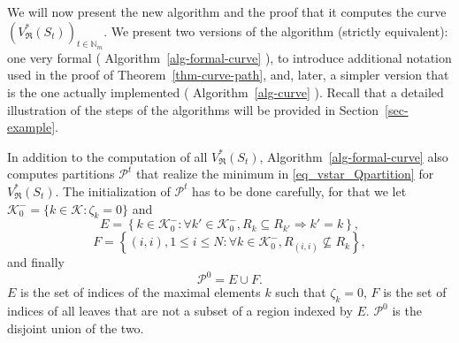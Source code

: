\documentclass[
  11pt,
  a4paper,
]{article}
\theoremstyle{plain}
\theoremstyle{definition}
\theoremstyle{plain}
\theoremstyle{definition}
\theoremstyle{plain}
\theoremstyle{remark}
\begin{document}
We will now present the new algorithm and the proof that it computes the
curve \((V^*_{\mathfrak{R}}(S_t))_{t\in\mathbb{N}_m}\). We present two
versions of the algorithm (strictly equivalent): one very formal
( Algorithm~\ref{alg-formal-curve} ), to introduce additional notation
used in the proof of Theorem~\ref{thm-curve-path}, and, later, a simpler
version that is the one actually implemented
( Algorithm~\ref{alg-curve} ). Recall that a detailed illustration of
the steps of the algorithms will be provided in
Section~\ref{sec-example}.

In addition to the computation of all \(V^*_{\mathfrak{R}}(S_t)\),
 Algorithm~\ref{alg-formal-curve}  also computes partitions
\(\mathcal{P}^t\) that realize the minimum in
\eqref{eq_vstar_Qpartition} for \(V^*_{\mathfrak{R}}(S_t)\). The
initialization of \(\mathcal{P}^t\) has to be done carefully, for that
we let \(\mathcal{K}_0^-=\{k\in\mathcal{K}: \zeta_k=0  \}\) and
\begin{equation}
E=\left\{k\in\mathcal{K}_0^-:\forall k'\in \mathcal{K}_0^-, R_k\subseteq R_{k'}\Rightarrow k'=k \right\},
\label{E}
\end{equation} \begin{equation}
F=\left\{(i,i), 1\leq i\leq N:\forall k\in \mathcal{K}_0^-, R_{(i,i)}\not\subseteq R_k  \right\},
\label{F}
\end{equation} and finally \begin{equation}
\mathcal{P}^0=E\cup F.
\label{cP0}
\end{equation} \(E\) is the set of indices of the maximal elements \(k\)
such that \(\zeta_k=0\), \(F\) is the set of indices of all leaves that
are not a subset of a region indexed by \(E\). \(\mathcal{P}^0\) is the
disjoint union of the two.
\end{document}
